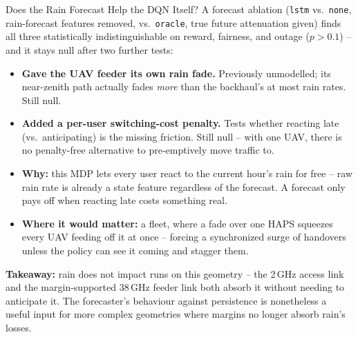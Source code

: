\documentclass[aspectratio=169]{beamer}
\begin{document}
\begin{frame}{Does the Rain Forecast Help the DQN Itself?}
\footnotesize
A forecast ablation (\texttt{lstm} vs.\ \texttt{none}, rain-forecast
features removed, vs.\ \texttt{oracle}, true future attenuation given)
finds all three statistically indistinguishable on reward, fairness,
and outage ($p>0.1$) -- and it stays null after two further tests:
\begin{itemize}
  \item \textbf{Gave the UAV feeder its own rain fade.} Previously
        unmodelled; its near-zenith path actually fades \emph{more}
        than the backhaul's at most rain rates. Still null.
  \item \textbf{Added a per-user switching-cost penalty.} Tests
        whether reacting late (vs.\ anticipating) is the missing
        friction. Still null -- with one UAV, there is no
        penalty-free alternative to pre-emptively move traffic to.
  \item \textbf{Why:} this MDP lets every user react to the current
        hour's rain for free -- raw rain rate is already a state
        feature regardless of the forecast. A forecast only pays off
        when reacting late costs something real.
  \item \textbf{Where it would matter:} a fleet, where a fade over
        one HAPS squeezes every UAV feeding off it at once --
        forcing a synchronized surge of handovers unless the policy
        can see it coming and stagger them.
\end{itemize}

\vspace{2mm}
\textbf{Takeaway:} rain does not impact runs on this geometry -- the
2\,GHz access link and the margin-supported 38\,GHz feeder link both
absorb it without needing to anticipate it. The forecaster's behaviour
against persistence is nonetheless a useful input for more complex
geometries where margins no longer absorb rain's losses.
\end{frame}
\end{document}
